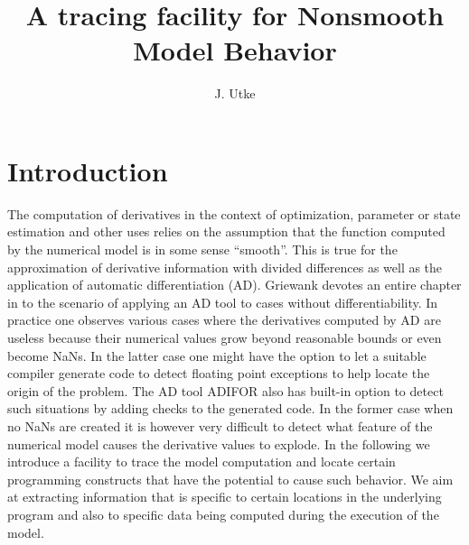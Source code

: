 \documentclass{article}
\title{A tracing facility for Nonsmooth Model Behavior}
\author{J. Utke}
\date{ }
\begin{document}
\maketitle
{}
\lstset{basicstyle=\footnotesize\tt, 
	numbers=left, 
	numberstyle=\scriptsize,
  	stepnumber=1, 
	numbersep=10pt, 
	breaklines=true,
	resetmargins=false,
	xleftmargin=6ex,
	columns=fullflexible}
\section{Introduction}

The computation of derivatives in the context of optimization, parameter or state estimation 
and other uses relies on the assumption that the function computed by the numerical 
model is in some sense ``smooth''. 
This is true for the approximation of derivative information with divided differences 
as well as the application of automatic differentiation (AD). 
Griewank devotes an entire chapter in \cite{Gri00} 
to the scenario of applying an AD tool to cases without differentiability. 
In practice one observes various cases where the derivatives computed by AD are useless 
because their numerical values grow  beyond reasonable bounds \cite{bischof} or even 
become NaNs. 
In the latter case one might have the option to let a suitable compiler generate 
code to detect floating point exceptions to help locate the origin of the problem.
The AD  tool ADIFOR \cite{adifor} also has built-in  option to detect 
such situations by adding checks to the generated code.   
In the former case when no NaNs are created it is however very difficult to 
detect what feature of the numerical model causes the derivative values to explode. 
In the following we introduce a facility to trace the model computation and locate 
certain programming constructs that have the potential to cause 
such behavior. We aim at extracting information that is specific to 
certain locations in the underlying program and also to specific data 
being computed during the execution of the model.  
   
\end{document}
